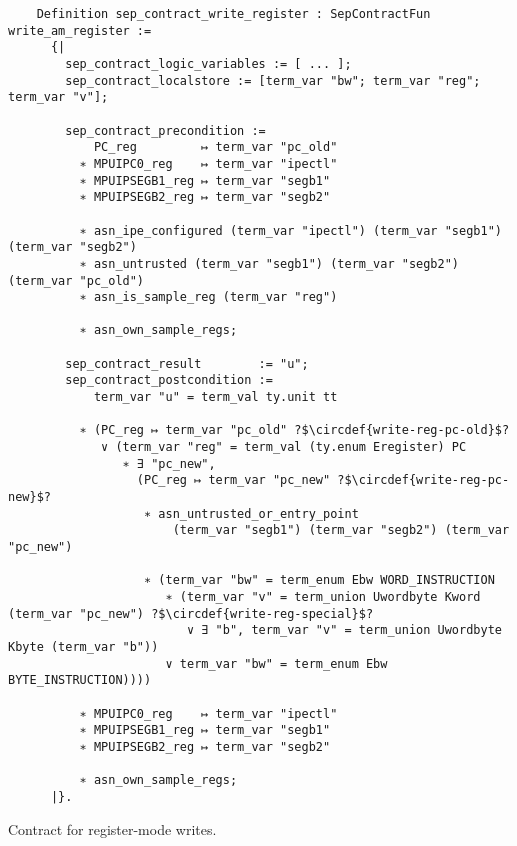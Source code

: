 \begin{listing}
  \startcstep
  \begin{verbatim}
    Definition sep_contract_write_register : SepContractFun write_am_register :=
      {|
        sep_contract_logic_variables := [ ... ];
        sep_contract_localstore := [term_var "bw"; term_var "reg"; term_var "v"];

        sep_contract_precondition :=
            PC_reg         ↦ term_var "pc_old"
          ∗ MPUIPC0_reg    ↦ term_var "ipectl"
          ∗ MPUIPSEGB1_reg ↦ term_var "segb1"
          ∗ MPUIPSEGB2_reg ↦ term_var "segb2"

          ∗ asn_ipe_configured (term_var "ipectl") (term_var "segb1") (term_var "segb2")
          ∗ asn_untrusted (term_var "segb1") (term_var "segb2") (term_var "pc_old")
          ∗ asn_is_sample_reg (term_var "reg")

          ∗ asn_own_sample_regs;

        sep_contract_result        := "u";
        sep_contract_postcondition :=
            term_var "u" = term_val ty.unit tt

          ∗ (PC_reg ↦ term_var "pc_old" ?$\circdef{write-reg-pc-old}$?
             ∨ (term_var "reg" = term_val (ty.enum Eregister) PC
                ∗ ∃ "pc_new",
                  (PC_reg ↦ term_var "pc_new" ?$\circdef{write-reg-pc-new}$?
                   ∗ asn_untrusted_or_entry_point
                       (term_var "segb1") (term_var "segb2") (term_var "pc_new")

                   ∗ (term_var "bw" = term_enum Ebw WORD_INSTRUCTION
                      ∗ (term_var "v" = term_union Uwordbyte Kword (term_var "pc_new") ?$\circdef{write-reg-special}$?
                         ∨ ∃ "b", term_var "v" = term_union Uwordbyte Kbyte (term_var "b"))
                      ∨ term_var "bw" = term_enum Ebw BYTE_INSTRUCTION))))

          ∗ MPUIPC0_reg    ↦ term_var "ipectl"
          ∗ MPUIPSEGB1_reg ↦ term_var "segb1"
          ∗ MPUIPSEGB2_reg ↦ term_var "segb2"

          ∗ asn_own_sample_regs;
      |}.
  \end{verbatim}
  \caption{Contract for register-mode writes.}
  \label{lst:write_register}
\end{listing}

